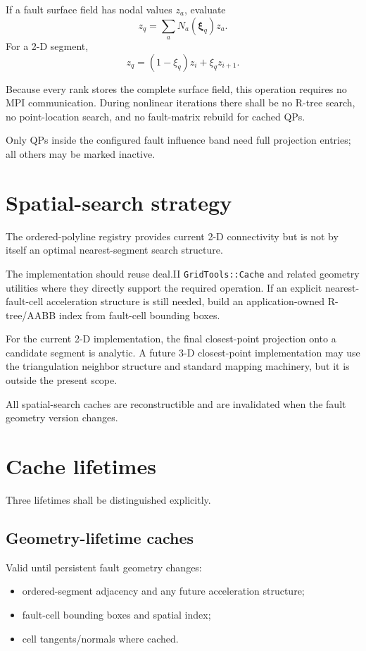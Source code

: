 \documentclass[11pt]{article}
\begin{document}
If a fault surface field has nodal values $z_a$, evaluate
\[
\boxed{
z_q=\sum_aN_a(\boldsymbol\xi_q)z_a.
}
\]
For a 2-D segment,
\[
z_q=(1-\xi_q)z_i+\xi_qz_{i+1}.
\]

Because every rank stores the complete surface field, this operation requires no MPI communication.  During nonlinear iterations there shall be no R-tree search, no point-location search, and no fault-matrix rebuild for cached QPs.

Only QPs inside the configured fault influence band need full projection entries; all others may be marked inactive.

\section{Spatial-search strategy}

The ordered-polyline registry provides current 2-D connectivity but is not by
itself an optimal nearest-segment search structure.

The implementation should reuse deal.II \texttt{GridTools::Cache} and related geometry utilities where they directly support the required operation.  If an explicit nearest-fault-cell acceleration structure is still needed, build an application-owned R-tree/AABB index from fault-cell bounding boxes.

For the current 2-D implementation, the final closest-point projection onto a candidate segment is analytic.  A future 3-D closest-point implementation may use the triangulation neighbor structure and standard mapping machinery, but it is outside the present scope.

All spatial-search caches are reconstructible and are invalidated when the fault geometry version changes.

\section{Cache lifetimes}

Three lifetimes shall be distinguished explicitly.

\subsection{Geometry-lifetime caches}
Valid until persistent fault geometry changes:
\begin{itemize}
  \item ordered-segment adjacency and any future acceleration structure;
  \item fault-cell bounding boxes and spatial index;
  \item cell tangents/normals where cached.
\end{itemize}
\end{document}
